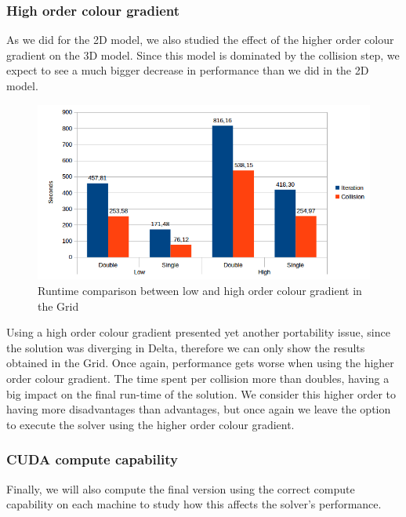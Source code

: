 \documentclass[12pt, openany]{book}
\begin{document}
\subsubsection{High order colour gradient}
As we did for the 2D model, we also studied the effect of the higher order colour gradient on the 3D model. Since this model is dominated by the collision step, we expect to see a much bigger decrease in performance than we did in the 2D model.

  \begin{figure}[H]
  	\centering
  	\includegraphics[width=\linewidth]{Resources/Images/highgrid.png}
  	\caption{Runtime comparison between low and high order colour gradient in the Grid}
  	\label{fig:highgrid}
  \end{figure}
  
  Using a high order colour gradient presented yet another portability issue, since the solution was diverging in Delta, therefore we can only show the results obtained in the Grid. Once again, performance gets worse when using the higher order colour gradient. The time spent per collision more than doubles, having a big impact on the final run-time of the solution. We consider this higher order to having more disadvantages than advantages, but once again we leave the option to execute the solver using the higher order colour gradient.


\subsubsection{CUDA compute capability}
Finally, we will also compute the final version using the correct compute capability on each machine to study how this affects the solver's performance.
\end{document}
